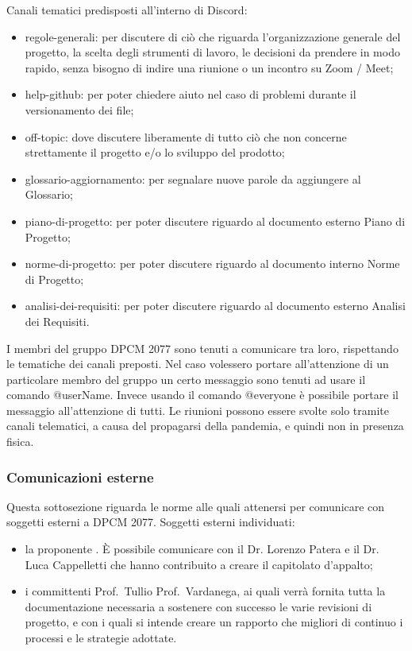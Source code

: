 Canali tematici predisposti all'interno di Discord:
\begin{itemize}
\item{regole-generali: per discutere di ciò che riguarda l’organizzazione generale del progetto, la scelta degli strumenti di lavoro, le decisioni da prendere in modo rapido, senza bisogno di indire una riunione o un incontro  su Zoom / Meet;}
\item{help-github: per poter chiedere aiuto nel caso di problemi durante il versionamento dei file;}
\item{off-topic: dove discutere liberamente di tutto ciò che non concerne strettamente il progetto e/o lo sviluppo del prodotto;}
\item{glossario-aggiornamento: per segnalare nuove parole da aggiungere al Glossario;}
\item{piano-di-progetto: per poter discutere riguardo al documento esterno Piano di Progetto;}
\item{norme-di-progetto: per poter discutere riguardo al documento interno Norme di Progetto;}
\item{analisi-dei-requisiti: per poter discutere riguardo al documento esterno Analisi dei Requisiti.}
\end{itemize}
I membri del gruppo DPCM 2077 sono tenuti a comunicare tra loro, rispettando le tematiche dei canali preposti. Nel caso volessero portare all’attenzione di un particolare membro del gruppo un certo messaggio sono tenuti ad usare
il comando @userName.
Invece usando il comando @everyone è possibile portare il messaggio all'attenzione di tutti.
Le riunioni possono essere svolte solo tramite canali telematici, a causa del propagarsi della pandemia, e quindi non in presenza fisica.

\subsubsection{Comunicazioni esterne}
Questa sottosezione riguarda le norme alle quali attenersi per comunicare con soggetti esterni a DPCM 2077.
Soggetti esterni individuati:
\begin{itemize}
\item{la proponente . È possibile comunicare con il Dr. Lorenzo Patera e il Dr. Luca Cappelletti che hanno contribuito a creare il capitolato d'appalto;}
\item{i committenti Prof.~Tullio Prof.~Vardanega, ai quali verrà fornita tutta la documentazione necessaria a sostenere con successo le varie revisioni di progetto, e con i quali si intende creare un rapporto che migliori 
di continuo i processi e le strategie adottate.}
\end{itemize}

